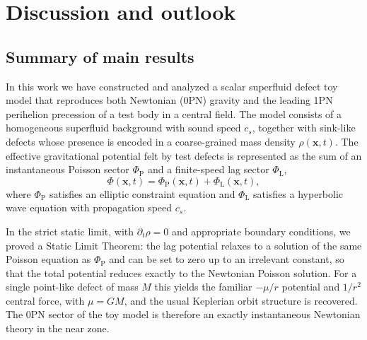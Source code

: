 \documentclass[11pt]{article}
\newcommand{\cS}{c_s}
\newcommand{\PhiP}{\Phi_{\mathrm{P}}}
\newcommand{\PhiL}{\Phi_{\mathrm{L}}}
\begin{document}
\section{Discussion and outlook}
\label{sec:discussion}

\subsection{Summary of main results}
\label{sec:discussion_summary}

In this work we have constructed and analyzed a scalar superfluid defect toy model that reproduces both Newtonian (0PN) gravity and the leading 1PN perihelion precession of a test body in a central field. The model consists of a homogeneous superfluid background with sound speed $\cS$, together with sink-like defects whose presence is encoded in a coarse-grained mass density $\rho(\mathbf{x},t)$. The effective gravitational potential felt by test defects is represented as the sum of an instantaneous Poisson sector $\PhiP$ and a finite-speed lag sector $\PhiL$,
\begin{equation}
  \Phi(\mathbf{x},t) = \PhiP(\mathbf{x},t) + \PhiL(\mathbf{x},t),
\end{equation}
where $\PhiP$ satisfies an elliptic constraint equation and $\PhiL$ satisfies a hyperbolic wave equation with propagation speed $\cS$.

In the strict static limit, with $\partial_t \rho = 0$ and appropriate boundary conditions, we proved a Static Limit Theorem: the lag potential relaxes to a solution of the same Poisson equation as $\PhiP$ and can be set to zero up to an irrelevant constant, so that the total potential reduces exactly to the Newtonian Poisson solution. For a single point-like defect of mass $M$ this yields the familiar $-\mu/r$ potential and $1/r^2$ central force, with $\mu = GM$, and the usual Keplerian orbit structure is recovered. The 0PN sector of the toy model is therefore an exactly instantaneous Newtonian theory in the near zone.
\end{document}
